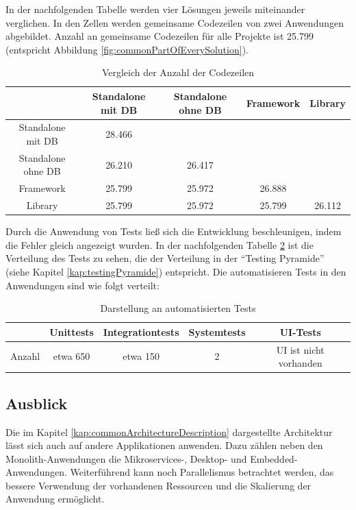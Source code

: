 In der nachfolgenden Tabelle werden vier Lösungen jeweils miteinander verglichen.
In den Zellen werden gemeinsame Codezeilen von zwei Anwendungen abgebildet.
Anzahl an gemeinsame Codezeilen für alle Projekte ist 25.799 (entspricht Abbildung \ref{fig:commonPartOfEverySolution}). 
\begin{table}[h!]
    \centering
    \begin{tabular}{|c|c| c| c| c| }
    \hline
                        & Standalone mit DB & Standalone ohne DB    & Framework & Library \\ 
    \hline
    Standalone mit DB   & 28.466             &                       &           & \\  
    \hline
    Standalone ohne DB  & 26.210             & 26.417                 &           & \\  
    \hline
    Framework           & 25.799             & 25.972                 & 26.888     & \\  
    \hline
    Library             & 25.799             & 25.972                 & 25.799     & 26.112 \\
    \hline
    \end{tabular}
    \caption{Vergleich der Anzahl der Codezeilen}
    \label{tab:compareLoC}
\end{table}

\newpage
Durch die Anwendung von Tests ließ sich die Entwicklung beschleunigen, indem die Fehler gleich angezeigt wurden.
In der nachfolgenden Tabelle \ref{tab:compareTests} ist die Verteilung des Tests zu sehen, 
die der Verteilung in der ``Testing Pyramide'' (siehe Kapitel \ref{kap:testingPyramide}) entspricht. 
Die automatisieren Tests in den Anwendungen sind wie folgt verteilt:

\begin{table}[h!]
    \centering
    \begin{tabular}{|c|c|c|c|c|}
        \hline
                & Unittests & Integrationtests & Systemtests & UI-Tests \\
        \hline
        Anzahl  & etwa 650  & etwa 150  & 2  & UI ist nicht vorhanden \\  
        \hline
    \end{tabular}
    \caption{Darstellung an automatisierten Tests}
    \label{tab:compareTests}
\end{table}

\subsection{Ausblick}
Die im Kapitel \ref{kap:commonArchitectureDescription} dargestellte Architektur 
lässt sich auch auf andere Applikationen anwenden. 
Dazu zählen neben den Monolith-Anwendungen die Mikroservices-, Desktop- und Embedded-Anwendungen.
Weiterführend kann noch Parallelismus betrachtet werden, 
das bessere Verwendung der vorhandenen Ressourcen und die Skalierung der Anwendung ermöglicht.

